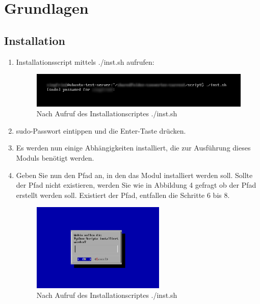 \documentclass[12pt]{scrartcl}
\begin{document}
\newpage
\section{Grundlagen}
\label{sec:grundlagen}
\subsection{Installation}
\label{sec:grundlagen-installation}
\begin{enumerate}

\item Installationsscript mittels ./inst.sh aufrufen:
\newline
\begin{figure}[htbp]
\includegraphics[width=1.0\textwidth]{schritt1}\par\vspace{0.5cm}
\caption{Nach Aufruf des Installationscriptes ./inst.sh}
\label{fig:script1}
\end{figure}
\item sudo-Passwort eintippen und die Enter-Taste drücken.
\item Es werden nun einige Abhängigkeiten installiert, die 
zur Ausführung dieses Moduls benötigt werden.
\newpage
\item Geben Sie nun den Pfad an, in den das Modul installiert werden soll.
Sollte der Pfad nicht existieren, werden Sie wie in Abbildung 4 gefragt
ob der Pfad erstellt werden soll. 
Existiert der Pfad, entfallen die Schritte 6 bis 8. 
\begin{figure}[htbp]
\centering
\includegraphics[width=0.6\textwidth]{schritt2}\par\vspace{0.5cm}
\caption{Nach Aufruf des Installationscriptes ./inst.sh}

\end{figure}
\end{enumerate}
\end{document}
